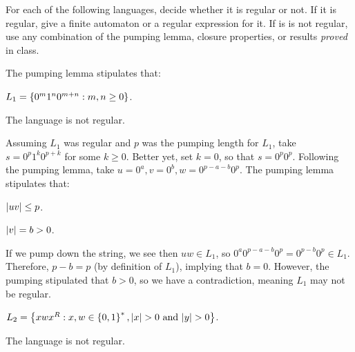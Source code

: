 \begin{problem}
  For each of the following languages, decide whether it is regular
  or not. If it is regular, give a finite automaton or a regular expression for it.
  If is is not regular, use any combination of
  the pumping lemma, closure properties, or results \emph{proved} in class.
  
  \step
  The pumping lemma stipulates that:

  \begin{enumalph}
    \item $L_1 = \left\{0^m 1^n 0^{m + n} : m, n \geq 0\right\}$.
      \begin{Answer}
        The language is not regular.

        \step
        Assuming $L_1$ was regular and $p$ was the pumping length for $L_1$,
        take $s = 0^p1^k0^{p+k}$ for some $k \geq 0$.
        Better yet, set $k = 0$, so that $s = 0^p0^{p}$.
        Following the pumping lemma, take $u = 0^a, v = 0^b, w = 0^{p-a-b}0^{p}$.
        The pumping lemma stipulates that:
        \begin{enumroman}
          \item $\lvert uv\rvert \le p$.
          \item $\lvert v\rvert = b > 0$.
        \end{enumroman}
        
        \step
        If we pump down the string, we see then $uw \in L_1$,
        so $0^a0^{p-a-b}0^{p} = 0^{p-b}0^{p} \in L_1$.
        Therefore, $p - b = p$ (by definition of $L_1$), implying that $b = 0$.
        However, the pumping stipulated that $b > 0$, so we have a contradiction,
        meaning $L_1$ may not be regular.
      \end{Answer}
    \item $L_2 = \left\{xwx^R : x, w \in \left\{0, 1\right\}^*, \lvert x\rvert > 0 \text{ and } \lvert y\rvert > 0\right\}$.
      \begin{Answer}
        The language is not regular.


\end{Answer}
\end{enumalph}
\end{problem}
